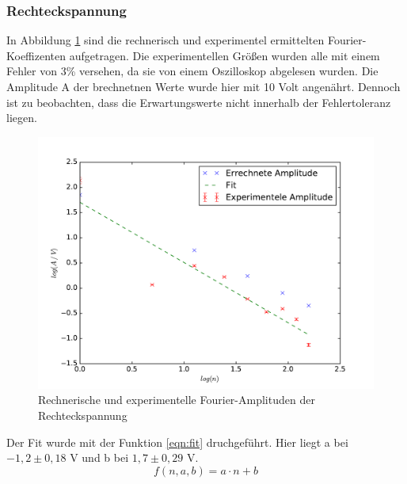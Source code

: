 \subsubsection{Rechteckspannung}
In Abbildung \ref{fig:pr} sind die rechnerisch und experimentel ermittelten Fourier-Koeffizenten aufgetragen. Die experimentellen Größen wurden alle mit einem Fehler
von 3\% versehen, da sie von einem Oszilloskop abgelesen wurden. Die Amplitude A der brechnetnen Werte wurde hier mit 10 Volt angenährt.
Dennoch ist zu beobachten, dass die Erwartungswerte nicht innerhalb der Fehlertoleranz liegen.
\begin{figure}
  \centering
  \includegraphics[width= \textwidth]{Plots/Rechteckplot.pdf}
  \caption{Rechnerische und experimentelle Fourier-Amplituden der Rechteckspannung}
  \label{fig:pr}
\end{figure}
\FloatBarrier
Der Fit wurde mit der Funktion \eqref{eqn:fit} druchgeführt. Hier liegt a bei $ -1,2 \pm 0,18$ V
und b bei $1,7 \pm 0,29 $ V.
\begin{equation}
  f(n , a , b) = a\cdot n + b
\label{eqn:fit}
\end{equation}
